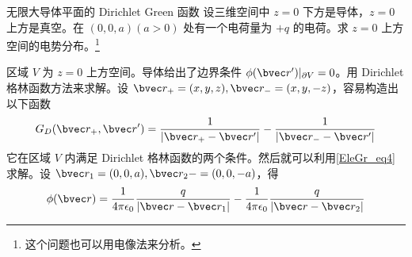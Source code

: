 \begin{example}{无限大导体平面的 Dirichlet Green 函数}
设三维空间中 $z=0$ 下方是导体，$z=0$ 上方是真空。在 $(0,0,a)(a>0)$ 处有一个电荷量为 $+q$ 的电荷。求 $z=0$ 上方空间的电势分布。\footnote{这个问题也可以用电像法来分析。}

区域 $V$ 为 $z=0$ 上方空间。导体给出了边界条件 $\phi(\bvec r')|_{\partial V}=0$。用 Dirichlet 格林函数方法来求解。设 $\bvec r_+=(x,y,z),\bvec r_-=(x,y,-z)$，容易构造出以下函数
\begin{equation}
G_D(\bvec r_+,\bvec r')=\frac{1}{|\bvec r_+-\bvec r'|}-\frac{1}{|\bvec r_--\bvec r'|}
\end{equation}
它在区域 $V$ 内满足 Dirichlet 格林函数的两个条件。然后就可以利用\autoref{EleGr_eq4} 求解。设 $\bvec r_1=(0,0,a),\bvec r_2-=(0,0,-a)$，得
\begin{equation}
\phi(\bvec r)=\frac{1}{4\pi \epsilon_0}\frac{q}{|\bvec r-\bvec r_1|}-\frac{1}{4\pi \epsilon_0}\frac{q}{|\bvec r-\bvec r_2|}
\end{equation}

\end{example}
